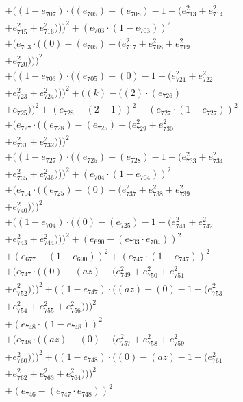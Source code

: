 \documentclass[10pt, a4paper]{article}
\begin{document}
\begin{small}
\begin{align*}
& + ((1 - e_{707})  \cdot  ((e_{705}) - (e_{708}) - 1 - (e_{713}^{2} + e_{714}^{2} \\
& + e_{715}^{2} + e_{716}^{2})))^{2} + (e_{703}  \cdot  (1 - e_{703}))^{2} \\
& + (e_{703}  \cdot  ((0) - (e_{705}) - (e_{717}^{2} + e_{718}^{2} + e_{719}^{2} \\
& + e_{720}^{2})))^{2} \\
& + ((1 - e_{703})  \cdot  ((e_{705}) - (0) - 1 - (e_{721}^{2} + e_{722}^{2} \\
& + e_{723}^{2} + e_{724}^{2})))^{2} + ((k) - ((2)  \cdot  (e_{726}) \\
& + e_{725}))^{2} + (e_{728} - (2 - 1))^{2} + (e_{727}  \cdot  (1 - e_{727}))^{2} \\
& + (e_{727}  \cdot  ((e_{728}) - (e_{725}) - (e_{729}^{2} + e_{730}^{2} \\
& + e_{731}^{2} + e_{732}^{2})))^{2} \\
& + ((1 - e_{727})  \cdot  ((e_{725}) - (e_{728}) - 1 - (e_{733}^{2} + e_{734}^{2} \\
& + e_{735}^{2} + e_{736}^{2})))^{2} + (e_{704}  \cdot  (1 - e_{704}))^{2} \\
& + (e_{704}  \cdot  ((e_{725}) - (0) - (e_{737}^{2} + e_{738}^{2} + e_{739}^{2} \\
& + e_{740}^{2})))^{2} \\
& + ((1 - e_{704})  \cdot  ((0) - (e_{725}) - 1 - (e_{741}^{2} + e_{742}^{2} \\
& + e_{743}^{2} + e_{744}^{2})))^{2} + (e_{690} - (e_{703}  \cdot  e_{704}))^{2} \\
& + (e_{677} - (1 - e_{690}))^{2} + (e_{747}  \cdot  (1 - e_{747}))^{2} \\
& + (e_{747}  \cdot  ((0) - (az) - (e_{749}^{2} + e_{750}^{2} + e_{751}^{2} \\
& + e_{752}^{2})))^{2} + ((1 - e_{747})  \cdot  ((az) - (0) - 1 - (e_{753}^{2} \\
& + e_{754}^{2} + e_{755}^{2} + e_{756}^{2})))^{2} \\
& + (e_{748}  \cdot  (1 - e_{748}))^{2} \\
& + (e_{748}  \cdot  ((az) - (0) - (e_{757}^{2} + e_{758}^{2} + e_{759}^{2} \\
& + e_{760}^{2})))^{2} + ((1 - e_{748})  \cdot  ((0) - (az) - 1 - (e_{761}^{2} \\
& + e_{762}^{2} + e_{763}^{2} + e_{764}^{2})))^{2} \\
& + (e_{746} - (e_{747}  \cdot  e_{748}))^{2} \\

\end{align*}
\end{small}
\end{document}
